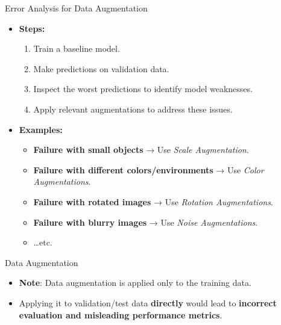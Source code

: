 \begin{frame}{Error Analysis for Data Augmentation}
\begin{itemize}
    \item \textbf{Steps:}
    \begin{enumerate}
        \item Train a baseline model.
        \item Make predictions on validation data.
        \item Inspect the worst predictions to identify model weaknesses.
        \item Apply relevant augmentations to address these issues.
    \end{enumerate}
    \item \textbf{Examples:}
    \begin{itemize}
        \item \textbf{Failure with small objects} → Use \textit{Scale Augmentation}.
        \item \textbf{Failure with different colors/environments} → Use \textit{Color Augmentations}.
        \item \textbf{Failure with rotated images} → Use \textit{Rotation Augmentations}.
        \item \textbf{Failure with blurry images} → Use \textit{Noise Augmentations}.
        \item \dots etc.
    \end{itemize}
\end{itemize}
\end{frame}

\begin{frame}{Data Augmentation}
\begin{itemize}
    \item \textbf{Note}: Data augmentation is applied only to the training data.
    \item Applying it to validation/test data \textbf{directly} would lead to \textbf{incorrect evaluation and misleading performance metrics}.
\end{itemize}
\end{frame}

